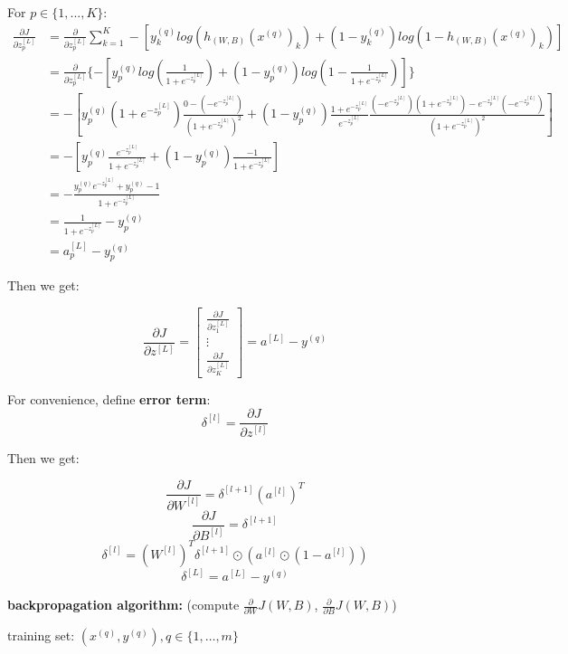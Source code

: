 \documentclass{article}
\begin{document}
\noindent For \(p \in \{1, ..., K\}\):
\begin{equation*}
\begin{split}
\frac{\partial J}{\partial z_p^{[L]}} 
& = \frac{\partial}{\partial z_p^{[L]}} \sum_{k = 1}^{K} -[y^{(q)}_k log(h_{(W, B)} (x^{(q)})_k) + (1 - y^{(q)}_k) log(1 - h_{(W, B)}(x^{(q)})_k)] \\
& = \frac{\partial}{\partial z_p^{[L]}} \{-[y^{(q)}_p log(\frac{1}{1 + e^{-z_p^{[L]}}}) + (1 - y^{(q)}_p) log(1 - \frac{1}{1 + e^{-z_p^{[L]}}})]\} \\
& = - [y^{(q)}_p (1 + e^{-z_p^{[L]}}) \frac{0 - (-e^{-z_p^{[L]}})}{(1 + e^{-z_p^{[L]}})^2} + (1 - y^{(q)}_p) \frac{1 + e^{-z_p^{[L]}}}{e^{-z_p^{[L]}}} \frac{(-e^{-z_p^{[L]}})(1 + e^{-z_p^{[L]}}) - e^{-z_p^{[L]}}(-e^{-z_p^{[L]}})}{(1 + e^{-z_p^{[L]}})^2}] \\
& = - [y_p^{(q)} \frac{e^{-z_p^{[L]}}}{1 + e^{-z_p^{[L]}}} + (1 - y_p^{(q)}) \frac{-1}{1 + e^{-z_p^{[L]}}}] \\
& = - \frac{y_p^{(q)}e^{-z_p^{[L]}} + y_p^{(q)} - 1}{1 + e^{-z_p^{[L]}}} \\
& = \frac{1}{1 + e^{-z_p^{[L]}}} - y_p^{(q)} \\ 
& = a_p^{[L]} - y_p^{(q)}
\end{split}
\end{equation*}

\noindent Then we get:

\[\frac{\partial J}{\partial z^{[L]}} = 
\begin{bmatrix}
\frac{\partial J}{\partial z_1^{[L]}} \\
\vdots \\
\frac{\partial J}{\partial z_K^{[L]}}
\end{bmatrix}
= a^{[L]} - y^{(q)}
\]

\noindent For convenience, define \textbf{error term}: 
\[\delta^{[l]} = \frac{\partial J}{\partial z^{[l]}}\]

\noindent Then we get:

\[\frac{\partial J}{\partial W^{[l]}} = \delta^{[l + 1]} (a^{[l]})^T\]
\[\frac{\partial J}{\partial B^{[l]}} = \delta^{[l + 1]}\]
\[\delta^{[l]} = (W^{[l]})^T \delta^{[l + 1]} \odot (a^{[l]} \odot (1 - a^{[l]}))\]
\[\delta^{[L]} = a^{[L]} - y^{(q)}\]

\noindent \textbf{backpropagation algorithm:} (compute \(\frac{\partial}{\partial W} J(W, B)\), \(\frac{\partial}{\partial B} J(W, B)\))

\noindent training set: \((x^{(q)}, y^{(q)}), q \in \{1, \dots, m\}\)
\end{document}
